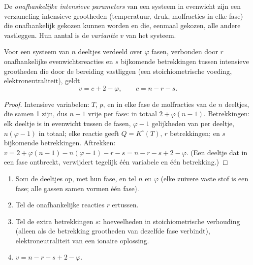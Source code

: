 \begin{definition}[Variantie]\label{def:b2:equilibrium-shifts:variance}
De \emph{onafhankelijke intensieve parameters}
van een systeem in evenwicht zijn een verzameling intensieve grootheden
(temperatuur, druk, molfracties in elke fase) die onafhankelijk gekozen
kunnen worden en die, eenmaal gekozen, alle andere vastleggen. Hun aantal is de
\emph{variantie} $v$ van het systeem.
\end{definition}

\begin{theorem}[Faseregel]\label{thm:b2:equilibrium-shifts:phase-rule}
Voor een systeem van $n$ deeltjes verdeeld over $\varphi$ fasen, verbonden door $r$
onafhankelijke evenwichtsreacties en $s$ bijkomende betrekkingen tussen
intensieve grootheden die door de bereiding vastliggen (een stoichiometrische voeding,
elektroneutraliteit), geldt
\[
  v = c + 2 - \varphi, \qquad c = n - r - s .
\]
\end{theorem}

\begin{proof}
Intensieve variabelen: $T$, $p$, en in elke fase de molfracties van de
$n$ deeltjes, die samen 1 zijn, dus $n - 1$ vrije per fase: in totaal $2 +
\varphi(n - 1)$. Betrekkingen: elk deeltje is in evenwicht tussen de
fasen, $\varphi - 1$ gelijkheden van  per deeltje, $n(\varphi -
1)$ in totaal; elke reactie geeft $Q = K^\circ(T)$, $r$ betrekkingen; en $s$
bijkomende betrekkingen. Aftrekken: $v = 2 + \varphi(n - 1) - n(\varphi - 1) - r -
s = n - r - s + 2 - \varphi$. (Een deeltje dat in een fase ontbreekt, verwijdert
tegelijk één variabele en één betrekking.)
\end{proof}

\begin{method}\label{met:b2:equilibrium-shifts:variance}
\begin{enumerate}
  \item Som de deeltjes op, met hun fase, en tel $n$ en $\varphi$
        (elke zuivere vaste stof is een fase; alle gassen samen vormen één fase).
  \item Tel de onafhankelijke reacties $r$ ertussen.
  \item Tel de extra betrekkingen $s$: hoeveelheden in stoichiometrische verhouding
        (alleen als de betrekking grootheden van dezelfde fase verbindt),
        elektroneutraliteit van een ionaire oplossing.
  \item $v = n - r - s + 2 - \varphi$.
\end{enumerate}
\end{method}

